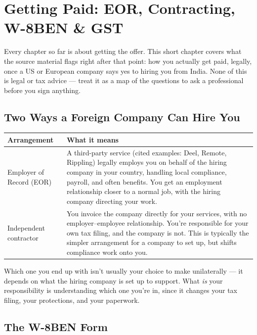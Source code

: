 \chapter{Getting Paid: EOR, Contracting, W-8BEN \& GST}
\label{ch:getting-paid}

Every chapter so far is about getting the offer. This short chapter covers what the source material flags right
after that point: how you actually get paid, legally, once a US or European company says yes to hiring you from
India. None of this is legal or tax advice — treat it as a map of the questions to ask a professional before you
sign anything.

\section{Two Ways a Foreign Company Can Hire You}

\begin{longtable}{p{} p{}}
\toprule
\textbf{Arrangement} & \textbf{What it means} \\
\midrule
\endhead
Employer of Record (EOR) & A third-party service (cited examples: Deel, Remote, Rippling) legally employs you on
behalf of the hiring company in your country, handling local compliance, payroll, and often benefits. You get an
employment relationship closer to a normal job, with the hiring company directing your work. \\
Independent contractor & You invoice the company directly for your services, with no employer--employee
relationship. You're responsible for your own tax filing, and the company is not. This is typically the simpler
arrangement for a company to set up, but shifts compliance work onto you. \\
\bottomrule
\end{longtable}

\begin{keytakeaway}
Which one you end up with isn't usually your choice to make unilaterally — it depends on what the hiring company
is set up to support. What \emph{is} your responsibility is understanding which one you're in, since it changes
your tax filing, your protections, and your paperwork.
\end{keytakeaway}

\section{The W-8BEN Form}

